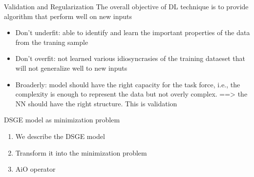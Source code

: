 \documentclass[aspectratio=169]{beamer} %
\begin{document}
\begin{frame}{Validation and Regularization}
The overall objective of DL technique is to provide algorithm that perform well on new inputs

\begin{itemize}
    \item Don't underfit: able to identify and learn the important properties of the data from the traning sample
    \item Don't overfit: not learned various idiosyncrasies of the training dataeset that will not generalize well to new inputs
    \item Broaderly: model should have the right capacity for the task force, i.e., the complexity is enough to represent the data but not overly complex. ==> the NN should have the right structure. This is validation
\end{itemize}
    
\end{frame}

\begin{frame}{DSGE model as minimization problem}
    \begin{enumerate}
        \item We describe the DSGE model 
        \item Transform it into the minimization problem 
        \item AiO operator
    \end{enumerate}
\end{frame}
\end{document}
